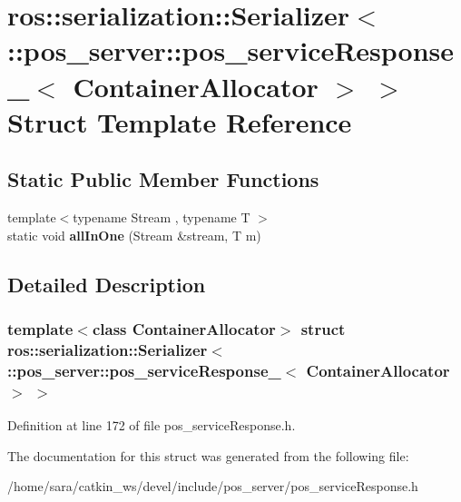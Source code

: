 \hypertarget{structros_1_1serialization_1_1Serializer_3_01_1_1pos__server_1_1pos__serviceResponse___3_01ContainerAllocator_01_4_01_4}{}\section{ros\+:\+:serialization\+:\+:Serializer$<$ \+:\+:pos\+\_\+server\+:\+:pos\+\_\+service\+Response\+\_\+$<$ Container\+Allocator $>$ $>$ Struct Template Reference}
\label{structros_1_1serialization_1_1Serializer_3_01_1_1pos__server_1_1pos__serviceResponse___3_01ContainerAllocator_01_4_01_4}
\subsection*{Static Public Member Functions}
\begin{DoxyCompactItemize}
\item 
\mbox{\label{structros_1_1serialization_1_1Serializer_3_01_1_1pos__server_1_1pos__serviceResponse___3_01ContainerAllocator_01_4_01_4_a090601129ab700fcce6a61c8896ae3e6}} 
{\footnotesize template$<$typename Stream , typename T $>$ }\\static void {\bfseries all\+In\+One} (Stream \&stream, T m)
\end{DoxyCompactItemize}


\subsection{Detailed Description}
\subsubsection*{template$<$class Container\+Allocator$>$\newline
struct ros\+::serialization\+::\+Serializer$<$ \+::pos\+\_\+server\+::pos\+\_\+service\+Response\+\_\+$<$ Container\+Allocator $>$ $>$}



Definition at line 172 of file pos\+\_\+service\+Response.\+h.



The documentation for this struct was generated from the following file\+:\begin{DoxyCompactItemize}
\item 
/home/sara/catkin\+\_\+ws/devel/include/pos\+\_\+server/pos\+\_\+service\+Response.\+h\end{DoxyCompactItemize}

